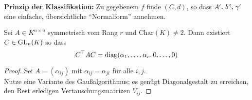 \documentclass[parskip,a4paper,twoside,DIV15,BCOR12mm]{scrbook}
\begin{document}
\textbf{Prinzip der Klassifikation:} Zu gegebenem \(f\) finde \((C,d)\), so 
dass \(A',\,b",\,\gamma'\) eine einfache, übersichtliche ``Normalform''
annehmen.

\begin{comment}
\(\vp\) bewirkt Wechsel des Koordinatensystems \(y=\vp^{-1}(x)=D_{\mathcal{L}}(x)\).
\(y\) beschreibt \(Q=\mathcal{N}(f)\) im Koordinatensystem \(\mathcal{L}\).
\end{comment}
\begin{theo}
\label{Satz 23.1}
Sei \(A\in K^{n\times n}\) symmetrisch vom Rang \(r\) und 
\(\text{Char}(K)\neq 2\). Dann existiert \(C\in\operatorname{GL}_{n}(K)\) so dass 
\[
C^{\top}AC=\operatorname{diag}(\alpha_{1},\ldots,\alpha_{r},0,\ldots,0)
\]
\end{theo}
\begin{proof}
Sei \(A=(\alpha_{ij})\) mit \(\alpha_{ij}=\alpha_{ji}\) für alle \(i,j\).\\
Nutze eine Variante des Gaußalgorithmus; es genügt Diagonalgestalt zu 
erreichen, den Rest erledigen Vertauschungsmatrizen \(V_{ij}\).


\end{proof}
\end{document}
